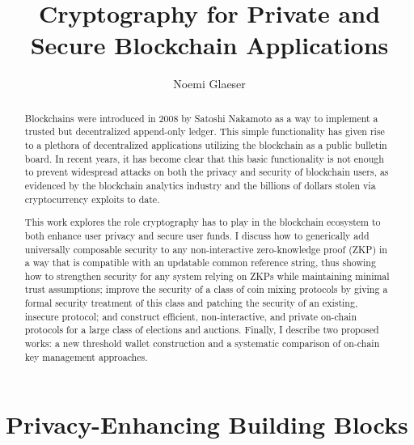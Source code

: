 \documentclass{article}
\title{Cryptography for Private and Secure Blockchain Applications}
\author{Noemi Glaeser}
\date{}
\newcommand{\noemi}[1]{\textcolor{magenta}{Noemi: #1}}
\begin{document}
\maketitle
\begin{abstract}
Blockchains were introduced in 2008 by Satoshi Nakamoto as a way to implement a trusted but decentralized append-only ledger. This simple functionality has given rise to a plethora of decentralized applications utilizing the blockchain as a public bulletin board. In recent years, it has become clear that this basic functionality is not enough to prevent widespread attacks on both the privacy and security of blockchain users, as evidenced by the blockchain analytics industry and the billions of dollars stolen via cryptocurrency exploits to date. 

This work explores the role cryptography has to play in the blockchain ecosystem to both enhance user privacy and secure user funds. I discuss how to generically add universally composable security to any non-interactive zero-knowledge proof (ZKP) in a way that is compatible with an updatable common reference string, thus showing how to strengthen security for any system relying on ZKPs while maintaining minimal trust assumptions; improve the security of a class of coin mixing protocols by giving a formal security treatment of this class and patching the security of an existing, insecure protocol; and construct efficient, non-interactive, and private on-chain protocols for a large class of elections and auctions. Finally, I describe two proposed works: a new threshold wallet construction and a systematic comparison of on-chain key management approaches.

\end{abstract}

\tableofcontents
\newpage



\section{Privacy-Enhancing Building Blocks}\label{sec:building-blocks}
\end{document}
